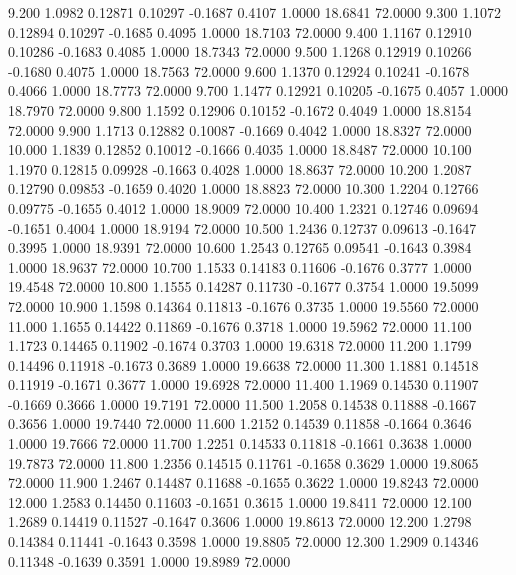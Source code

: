    9.200   1.0982   0.12871   0.10297  -0.1687   0.4107   1.0000  18.6841  72.0000
   9.300   1.1072   0.12894   0.10297  -0.1685   0.4095   1.0000  18.7103  72.0000
   9.400   1.1167   0.12910   0.10286  -0.1683   0.4085   1.0000  18.7343  72.0000
   9.500   1.1268   0.12919   0.10266  -0.1680   0.4075   1.0000  18.7563  72.0000
   9.600   1.1370   0.12924   0.10241  -0.1678   0.4066   1.0000  18.7773  72.0000
   9.700   1.1477   0.12921   0.10205  -0.1675   0.4057   1.0000  18.7970  72.0000
   9.800   1.1592   0.12906   0.10152  -0.1672   0.4049   1.0000  18.8154  72.0000
   9.900   1.1713   0.12882   0.10087  -0.1669   0.4042   1.0000  18.8327  72.0000
  10.000   1.1839   0.12852   0.10012  -0.1666   0.4035   1.0000  18.8487  72.0000
  10.100   1.1970   0.12815   0.09928  -0.1663   0.4028   1.0000  18.8637  72.0000
  10.200   1.2087   0.12790   0.09853  -0.1659   0.4020   1.0000  18.8823  72.0000
  10.300   1.2204   0.12766   0.09775  -0.1655   0.4012   1.0000  18.9009  72.0000
  10.400   1.2321   0.12746   0.09694  -0.1651   0.4004   1.0000  18.9194  72.0000
  10.500   1.2436   0.12737   0.09613  -0.1647   0.3995   1.0000  18.9391  72.0000
  10.600   1.2543   0.12765   0.09541  -0.1643   0.3984   1.0000  18.9637  72.0000
  10.700   1.1533   0.14183   0.11606  -0.1676   0.3777   1.0000  19.4548  72.0000
  10.800   1.1555   0.14287   0.11730  -0.1677   0.3754   1.0000  19.5099  72.0000
  10.900   1.1598   0.14364   0.11813  -0.1676   0.3735   1.0000  19.5560  72.0000
  11.000   1.1655   0.14422   0.11869  -0.1676   0.3718   1.0000  19.5962  72.0000
  11.100   1.1723   0.14465   0.11902  -0.1674   0.3703   1.0000  19.6318  72.0000
  11.200   1.1799   0.14496   0.11918  -0.1673   0.3689   1.0000  19.6638  72.0000
  11.300   1.1881   0.14518   0.11919  -0.1671   0.3677   1.0000  19.6928  72.0000
  11.400   1.1969   0.14530   0.11907  -0.1669   0.3666   1.0000  19.7191  72.0000
  11.500   1.2058   0.14538   0.11888  -0.1667   0.3656   1.0000  19.7440  72.0000
  11.600   1.2152   0.14539   0.11858  -0.1664   0.3646   1.0000  19.7666  72.0000
  11.700   1.2251   0.14533   0.11818  -0.1661   0.3638   1.0000  19.7873  72.0000
  11.800   1.2356   0.14515   0.11761  -0.1658   0.3629   1.0000  19.8065  72.0000
  11.900   1.2467   0.14487   0.11688  -0.1655   0.3622   1.0000  19.8243  72.0000
  12.000   1.2583   0.14450   0.11603  -0.1651   0.3615   1.0000  19.8411  72.0000
  12.100   1.2689   0.14419   0.11527  -0.1647   0.3606   1.0000  19.8613  72.0000
  12.200   1.2798   0.14384   0.11441  -0.1643   0.3598   1.0000  19.8805  72.0000
  12.300   1.2909   0.14346   0.11348  -0.1639   0.3591   1.0000  19.8989  72.0000
